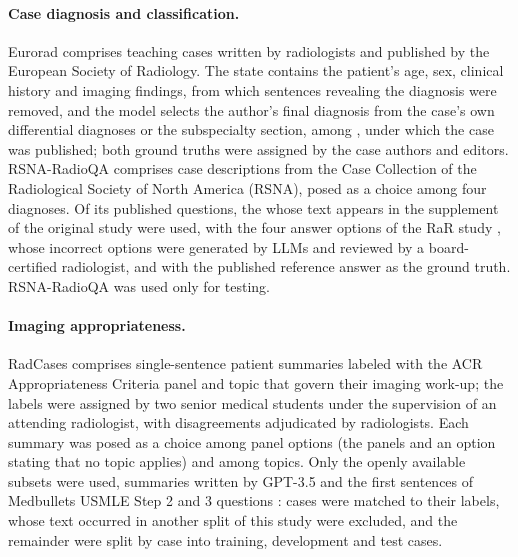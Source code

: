 \documentclass[11pt]{article}
\begin{document}
\paragraph{Case diagnosis and classification.} Eurorad \citep{eurorad,wanglab2025eurorad} comprises teaching cases written by radiologists and published by the European Society of Radiology. The state contains the patient's age, sex, clinical history and imaging findings, from which sentences revealing the diagnosis were removed, and the model selects the author's final diagnosis from the case's own differential diagnoses or the subspecialty section, among , under which the case was published; both ground truths were assigned by the case authors and editors. RSNA-RadioQA \citep{tayebiarasteh2025radiorag} comprises case descriptions from the Case Collection of the Radiological Society of North America (RSNA), posed as a choice among four diagnoses. Of its  published questions, the  whose text appears in the supplement of the original study were used, with the four answer options of the RaR study \citep{wind2025rar}, whose incorrect options were generated by LLMs and reviewed by a board-certified radiologist, and with the published reference answer as the ground truth. RSNA-RadioQA was used only for testing.

\paragraph{Imaging appropriateness.} RadCases \citep{yao2025radcases} comprises single-sentence patient summaries labeled with the ACR Appropriateness Criteria panel and topic that govern their imaging work-up; the labels were assigned by two senior medical students under the supervision of an attending radiologist, with disagreements adjudicated by radiologists. Each summary was posed as a choice among  panel options (the panels and an option stating that no topic applies) and among  topics. Only the openly available subsets were used, summaries written by GPT-3.5 and the first sentences of Medbullets USMLE Step 2 and 3 questions \citep{chen2024medbullets}:  cases were matched to their labels,  whose text occurred in another split of this study were excluded, and the remainder were split by case into  training,  development and  test cases.
\end{document}
